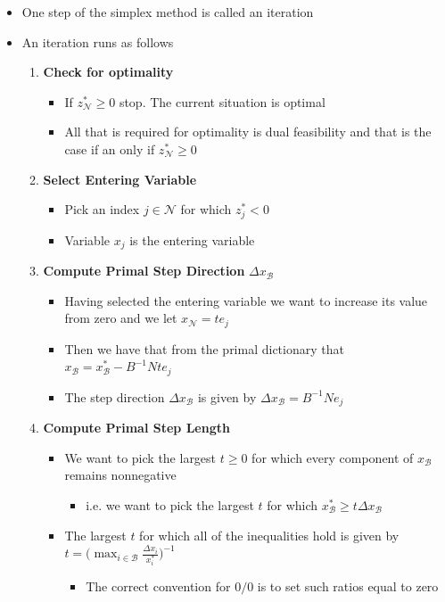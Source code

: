 \documentclass[11pt]{article}
\begin{document}
\begin{itemize}
\begin{itemize}
\item One step of the simplex method is called an iteration
\item An iteration runs as follows
\begin{enumerate}
\item \textbf{Check for optimality}
\begin{itemize}
\item If \(z ^* _{\mathcal N} \geq 0\) stop. The current situation is optimal
\item All that is required for optimality is dual feasibility and that is the case if an only if \(z ^*_{\mathcal N} \geq 0\)
\end{itemize}
\item \textbf{Select Entering Variable}
\begin{itemize}
\item Pick an index \(j \in \mathcal N\) for which \(z_j^* < 0\)
\item Variable \(x_j\) is the entering variable
\end{itemize}
\item \textbf{Compute Primal Step Direction} \(\Delta x_\mathcal B\)
\begin{itemize}
\item Having selected the entering variable we want to increase its value from zero and we let \(x_{\mathcal N} = t e_j\)
\item Then we have that from the primal dictionary that \(x_{\mathcal B} = x^*_{\mathcal B} - B^{-1} N t e_j\)
\item The step direction \(\Delta x_{\mathcal B}\) is given by \(\Delta x_{\mathcal B} = B^{-1} N e_j\)
\end{itemize}
\item \textbf{Compute Primal Step Length}
\begin{itemize}
\item We want to pick the largest \(t \geq 0\) for which every component of \(x_{\mathcal B}\) remains nonnegative
\begin{itemize}
\item i.e. we want to pick the largest \(t\) for which \(x^*_{\mathcal B} \geq t \Delta x_{\mathcal B}\)
\end{itemize}
\item The largest \(t\) for which all of the inequalities hold is given by \(t = \big(\max_{i \in \mathcal B} \frac{\Delta x_i}{x_i^*}\big)^{-1}\)
\begin{itemize}
\item The correct convention for \(0/0\) is to set such ratios equal to zero

\end{itemize}
\end{itemize}
\end{enumerate}
\end{itemize}
\end{itemize}
\end{document}
